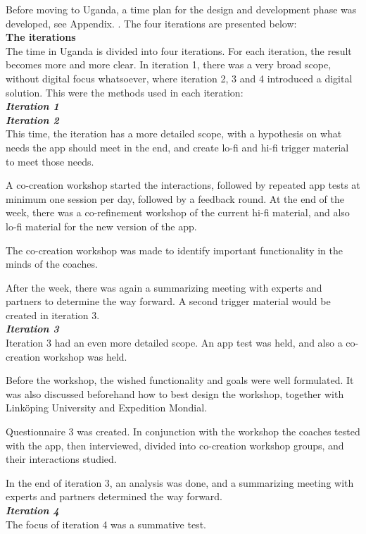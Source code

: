 Before moving to Uganda, a time plan for the design and development phase was developed, see Appendix. . The four iterations are presented below: \\

\textbf{The iterations} \\
The time in Uganda is divided into four iterations. For each iteration, the result becomes more and more clear. In iteration 1, there was a very broad scope, without digital focus whatsoever, where iteration 2, 3 and 4 introduced a digital solution. This were the methods used in each iteration:\\


\textit{\textbf{Iteration 1}}\\

   \textit{\textbf{Iteration 2}}\\
   This time, the iteration has a more detailed scope, with a hypothesis on what needs the app should meet in the end, and create lo-fi and hi-fi trigger material to meet those needs.

   A co-creation workshop started the interactions, followed by repeated app tests at minimum one session per day, followed by a feedback round. At the end of the week, there was a co-refinement workshop of the current hi-fi material, and also lo-fi material for the new version of the app.

   The co-creation workshop was made to identify important functionality in the minds of the coaches.

   After the week, there was again a summarizing meeting with experts and partners to determine the way forward. A second trigger material would be created in iteration 3.\\

   \textit{\textbf{Iteration 3}}\\
   Iteration 3 had an even more detailed scope. An app test was held, and also a co-creation workshop was held.

   Before the workshop, the wished functionality and goals were well formulated. It was also discussed beforehand how to best design the workshop, together with Linköping University and Expedition Mondial.

   Questionnaire 3 was created. In conjunction with the workshop the coaches tested with the app, then interviewed, divided into co-creation workshop groups, and their interactions studied.

    In the end of iteration 3, an analysis was done, and a summarizing meeting with experts and partners determined the way forward.\\

    \textit{\textbf{Iteration 4}}\\
    The focus of iteration 4 was a summative test. \\
